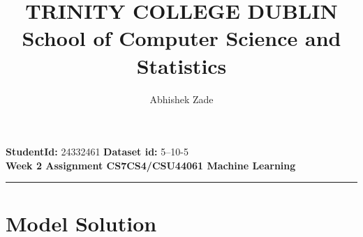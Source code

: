 \documentclass{article}
\begin{document}
\vspace{-2cm}
\title{\LARGE \textbf{TRINITY COLLEGE DUBLIN} \\ %
\large School of Computer Science and Statistics}
\author{Abhishek Zade}
\date{} %
\maketitle
\vspace{-1cm} %

\noindent
\textbf{StudentId:} 24332461 \hfill \textbf{Dataset id:} 5--10-5 \\
\textbf{Week 2 Assignment \hfill CS7CS4/CSU44061 Machine Learning} \\

\noindent\rule{\textwidth}{0.4pt} %

\section*{Model Solution}
\end{document}
